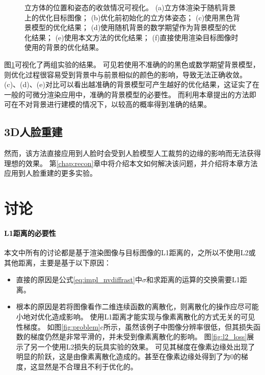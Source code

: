 \begin{figure}
    \caption[立方体的位置和姿态的收敛情况可视化]{
        立方体的位置和姿态的收敛情况可视化。
        (a)立方体渲染于随机背景上的优化目标图像；
        (b)优化前初始化的立方体姿态；
        (c)使用黑色背景模型的优化结果；
        (d)使用随机背景的数学期望作为背景模型的优化结果；
        (e)使用本文方法的优化结果；
        (f)直接使用渲染目标图像时使用的背景的优化结果。
    }
    \label{fig:cube_opt_vis}
\end{figure}
图\ref{fig:cube_opt_vis}可视化了两组实验的结果。
可见若使用不准确的的黑色或数学期望背景模型，则优化过程很容易受到背景中与前景相似的颜色的影响，导致无法正确收敛。
(c)、(d)、(e)对比可以看出越准确的背景模型可产生越好的优化结果，这证实了在一般的可微分渲染应用中，准确的背景模型的必要性。
而利用本章提出的方法即可在不对背景进行建模的情况下，以较高的概率得到准确的结果。

\subsection{3D人脸重建}


然而，该方法直接应用到人脸时会受到人脸模型人工裁剪的边缘的影响而无法获得理想的效果。
第\ref{chap:recon}章中将介绍本文如何解决该问题，并介绍将本章方法应用到人脸重建的更多实验。

\section{讨论}
\label{sec:method_discuss}

\paragraph{L1距离的必要性}
本文中所有的讨论都是基于渲染图像与目标图像的L1距离的，之所以不使用L2或其他距离，主要是基于以下原因：
\begin{itemize}
\item 直接的原因是公式\eqref{eq:impl_nvdiffrast}中$\sigma$和求距离的运算的交换需要L1距离。
\item 根本的原因是若将图像看作二维连续函数的离散化，则离散化的操作应尽可能小地对优化造成影响。
使用L1距离才能实现与像素离散化的方式无关的可见性梯度。
如图\ref{fig:problem}c所示，虽然该例子中图像分辨率很低，但其损失函数的梯度仍然是非常平滑的，并未受到像素离散化的影响。
图\ref{fig:l2_loss}展示了另一个使用L2损失的玩具实验的效果。
可见其梯度在像素边缘处出现了明显的阶跃，这是由像素离散化造成的。甚至在像素边缘处得到了为0的梯度，这显然是不合理且不利于优化的。
\end{itemize}

